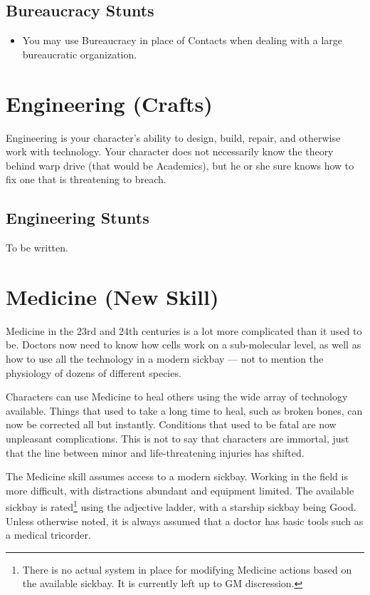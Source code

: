 \documentclass[12pt,titlepage,openany]{book}
\begin{document}
\subsection*{Bureaucracy Stunts}\label{subsec:bureaucracy-stunts}

\begin{itemize}
    \item {} You may use Bureaucracy in place of Contacts
        when dealing with a large bureaucratic organization.
\end{itemize}

\section{Engineering (Crafts)}\label{sec:engineering}

Engineering is your character's ability to design, build, repair, and otherwise
work with technology. Your character does not necessarily know the theory
behind warp drive (that would be Academics), but he or she sure knows how to
fix one that is threatening to breach.

\subsection*{Engineering Stunts}\label{subsec:engineering-stunts}

To be written.

\section{Medicine (New Skill)}\label{sec:medicine}

Medicine in the 23rd and 24th centuries is a lot more complicated than it used
to be. Doctors now need to know how cells work on a sub-molecular level, as
well as how to use all the technology in a modern sickbay --- not to mention
the physiology of dozens of different species.

Characters can use Medicine to heal others using the wide array of technology
available. Things that used to take a long time to heal, such as broken bones,
can now be corrected all but instantly. Conditions that used to be fatal are
now unpleasant complications. This is not to say that characters are immortal,
just that the line between minor and life-threatening injuries has shifted.

The Medicine skill assumes access to a modern sickbay. Working in the field is
more difficult, with distractions abundant and equipment limited. The available
sickbay is rated\footnote{There is no actual system in place for modifying
Medicine actions based on the available sickbay. It is currently left up to GM
discression.} using the adjective ladder, with a starship sickbay being Good.
Unless otherwise noted, it is always assumed that a doctor has basic tools such
as a medical tricorder.
\end{document}
